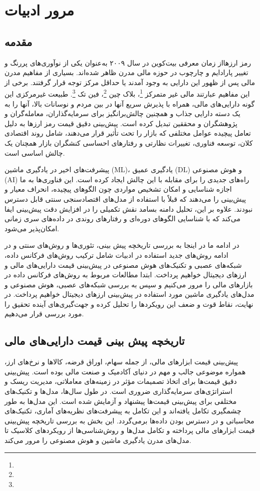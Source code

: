 \chapter{مرور ادبیات}
\section{مقدمه}
رمز ارزهااز زمان معرفی بیت‌کوین در سال ۲۰۰۹ به‌عنوان یکی از نوآوری‌های پررنگ و تغییر پارادایم و چارچوب در حوزه مالی مدرن ظاهر شده‌اند. بسیاری از مفاهیم مدرن مالی پس از ظهور این دارایی به وجود آمدند یا حداقل مرکز توجه قرار گرفتند. برخی از این مفاهیم عبارتند مالی غیر متمرکز \footnote{}، بلاک چین \footnote{}، فین تک \footnote{}. طبیعت غیرمرکزی این گونه دارایی‌های مالی، همراه با پذیرش سریع آنها در بین مردم و نوسانات بالا، آنها را به یک دسته دارایی جذاب و همچنین چالش‌برانگیز برای سرمایه‌گذاران، معامله‌گران و پژوهشگران و محققین تبدیل کرده است. پیش‌بینی دقیق قیمت رمز ارزها به دلیل تعامل پیچیده عوامل مختلفی که بازار را تحت تأثیر قرار می‌دهند، شامل روند اقتصادی کلان، توسعه فناوری، تغییرات نظارتی و رفتار‌های احساسی کنشگران بازار همچنان یک چالش اساسی است.

پیشرفت‌های اخیر در یادگیری ماشین (ML)، یادگیری عمیق (DL) و هوش مصنوعی (AI) راه‌های جدیدی را برای مقابله با این چالش ایجاد کرده است. این فناوری‌ها به ما اجازه شناسایی و امکان تشخیص مواردی چون الگوهای پیچیده، انحراف معیار و پیش‌بینی را می‌دهند که قبلاً با استفاده از مدل‌های اقتصادسنجی سنتی قابل دسترس نبودند. علاوه بر این، تحلیل دامنه بسامد نقش تکمیلی را در افزایش دقت پیش‌بینی ایفا می‌کند که با شناسایی الگوهای دوره‌ای و رفتارهای روندی در داده‌های سری زمانی امکان‌پذیر می‌شود.


در ادامه ما در اینجا به بررسی تاریخچه پیش بینی، تئوری‌ها و روش‌های سنتی و در ادامه روش‌های جدید استفاده در ادبیات شامل ترکیب روش‌های فرکانس داده، شبکه‌های عصبی و تکنیک‌های هوش مصنوعی در پیش‌بینی قیمت دارایی‌های مالی و ارزهای دیجیتال خواهیم پرداخت. ابتدا مطالعات مربوط به روش‌های فرکانس داده در بازارهای مالی را مرور می‌کنیم و سپس به بررسی شبکه‌های عصبی، هوش مصنوعی و مدل‌های یادگیری ماشین مورد استفاده در پیش‌بینی ارزهای دیجیتال خواهیم پرداخت. در نهایت، نقاط قوت و ضعف این رویکردها را تحلیل کرده و جهت‌گیری‌های آینده تحقیق را مورد بررسی قرار می‌دهیم.

\section{تاریخچه پیش بینی قیمت دارایی‌های مالی}
پیش‌بینی قیمت ابزارهای مالی، از جمله سهام، اوراق قرضه، کالاها و نرخ‌های ارز، همواره موضوعی جالب و مهم در دنیای آکادمیک و صنعت مالی بوده است. پیش‌بینی دقیق قیمت‌ها برای اتخاذ تصمیمات مؤثر در زمینه‌های معاملاتی، مدیریت ریسک و استراتژی‌های سرمایه‌گذاری ضروری است. در طول سال‌ها، مدل‌ها و تکنیک‌های مختلفی برای پیش‌بینی قیمت‌ها پیشنهاد و آزمایش شده است. این مدل‌ها به طور چشمگیری تکامل یافته‌اند و این تکامل به پیشرفت‌های نظریه‌های آماری، تکنیک‌های محاسباتی و در دسترس بودن داده‌ها برمی‌گردد. این بخش به بررسی تاریخچه پیش‌بینی قیمت ابزارهای مالی پرداخته و تکامل مدل‌ها و روش‌شناسی‌ها از رویکردهای کلاسیک تا مدل‌های مدرن یادگیری ماشین و هوش مصنوعی را مرور می‌کند.


